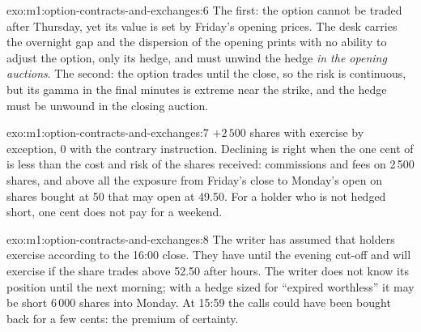 \begin{solution}{exo:m1:option-contracts-and-exchanges:6}
The first: the option cannot be traded after Thursday, yet its value is set
by Friday's opening prices. The desk carries the overnight gap and the
dispersion of the opening prints with no ability to adjust the option, only
its hedge, and must unwind the hedge \emph{in the opening auctions}. The
second: the option trades until the close, so the risk is continuous, but its
gamma in the final minutes is extreme near the strike, and the hedge must be
unwound in the closing auction.
\end{solution}

\begin{solution}{exo:m1:option-contracts-and-exchanges:7}
$+2\,500$ shares with exercise by exception, 0 with the contrary instruction.
Declining is right when the one cent of  is less than the cost
and risk of the shares received: commissions and fees on 2\,500 shares, and
above all the exposure from Friday's close to Monday's open on shares bought
at 50 that may open at 49.50. For a holder who is not hedged short, one cent
does not pay for a weekend.
\end{solution}

\begin{solution}{exo:m1:option-contracts-and-exchanges:8}
The writer has assumed that holders exercise according to the 16:00 close.
They have until the evening cut-off and will exercise if the share trades
above 52.50 after hours. The writer does not know its position until the
next morning; with a hedge sized for ``expired worthless'' it may be short
6\,000 shares into Monday. At 15:59 the calls could have been bought back for
a few cents: the premium of certainty.
\end{solution}

